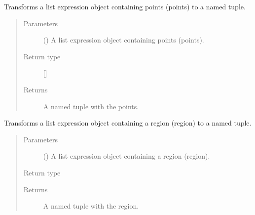 \documentclass[letterpaper,10pt,english]{sphinxmanual}
\begin{document}

\begin{fulllineitems}
\label{\detokenize{index:secondodb.api.algebras.secondospatialalgebra.parse_points}}
Transforms a list expression object containing points (points) to a named tuple.
\begin{quote}\begin{description}
\item[{Parameters}] \leavevmode
{} () \textendash{} A list expression object containing points (points).

\item[{Return type}] \leavevmode
{[}{]}

\item[{Returns}] \leavevmode
A named tuple with the points.

\end{description}\end{quote}

\end{fulllineitems}


\begin{fulllineitems}
\label{\detokenize{index:secondodb.api.algebras.secondospatialalgebra.parse_region}}
Transforms a list expression object containing a region (region) to a named tuple.
\begin{quote}\begin{description}
\item[{Parameters}] \leavevmode
{} () \textendash{} A list expression object containing a region (region).

\item[{Return type}] \leavevmode
{\hyperref[\detokenize{index:secondodb.api.algebras.secondospatialalgebra.Region}]{}}

\item[{Returns}] \leavevmode
A named tuple with the region.

\end{description}\end{quote}

\end{fulllineitems}
\end{document}
